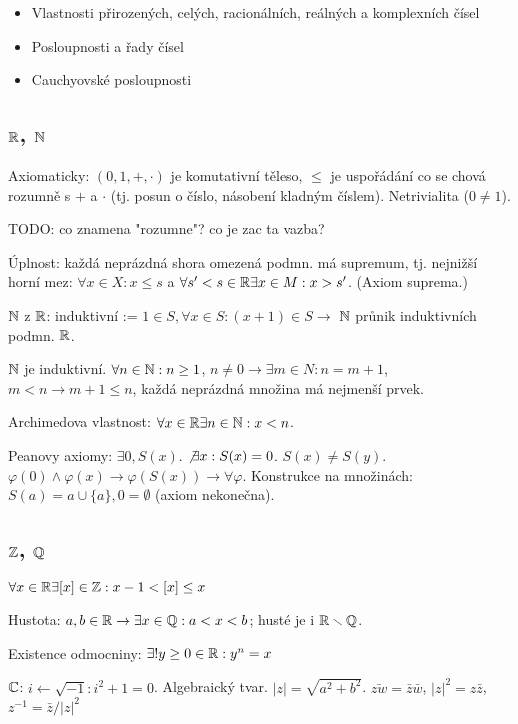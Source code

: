 \begin{understood}
	\begin{itemize}
	\item Vlastnosti přirozených, celých, racionálních, reálných a
		komplexních čísel
	\item Posloupnosti a řady čísel
	\item Cauchyovské posloupnosti
	\end{itemize}
\end{understood}

\subsection{$\mathbb{R}$, $\mathbb{N}$}
Axiomaticky: $(0,1,+,\cdot)$ je komutativní těleso, $\leq$ je uspořádání co se
chová rozumně s $+$ a $\cdot$ (tj. posun o číslo, násobení kladným číslem).
Netrivialita ($0\neq 1$).

TODO: co znamena "rozumne"? co je zac ta vazba?

Úplnost: každá neprázdná shora omezená podmn. má supremum, tj. nejnižší horní
mez: $\forall x\in X: x\leq s$ a $\forall s'<s\in\mathbb{R} \exists x\in M: x>s'$.
(Axiom suprema.)

$\mathbb{N}$ z $\mathbb{R}$: induktivní := $1\in S, \forall x\in S: (x+1)\in S \longrightarrow$
$\mathbb{N}$ průnik induktivních podmn. $\mathbb{R}$.

$\mathbb{N}$ je induktivní. $\forall n\in\mathbb{N}:n\geq 1$,
$n\neq 0\rightarrow\exists m\in N: n=m+1$, $m<n\rightarrow m+1\leq n$,
každá neprázdná množina má nejmenší prvek.

Archimedova vlastnost: $\forall x\in\mathbb{R}\exists n\in\mathbb{N}:x<n$.

Peanovy axiomy: $\exists 0, S(x)$. $\not\exists x: S(x)=0$. $S(x)\neq S(y)$.
$\varphi(0)\wedge \varphi(x)\rightarrow\varphi(S(x))\longrightarrow\forall\varphi$.
Konstrukce na množinách: $S(a)=a\cup\{a\},0=\emptyset$ (axiom nekonečna).

\subsection{$\mathbb{Z}$, $\mathbb{Q}$}

$\forall x\in\mathbb{R}\exists [x]\in\mathbb{Z}: x-1<[x]\leq x$

Hustota: $a,b\in\mathbb{R}\rightarrow\exists x\in\mathbb{Q}: a<x<b$; husté je i
$\mathbb{R}\smallsetminus\mathbb{Q}$.

Existence odmocniny: $\exists! y\geq 0\in\mathbb{R}: y^n=x$

$\mathbb{C}$: $i\gets\sqrt{-1}:i^2+1=0$. Algebraický tvar.
$|z|=\sqrt{a^2+b^2}$. $\bar{zw}=\bar{z}\bar{w}$, $|z|^2=z\bar{z}$,
$z^{-1}=\bar{z}/|z|^2$

